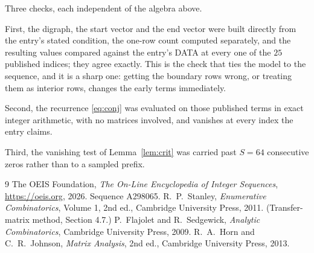 \documentclass[11pt,a4paper]{article}
\theoremstyle{plain}
\theoremstyle{definition}
\begin{document}
Three checks, each independent of the algebra above.

First, the digraph, the start vector and the end vector were built directly from the
entry's stated condition, the one-row count computed separately, and the resulting values
compared against the entry's DATA at every one of the $25$ published indices; they
agree exactly. This is the check that ties the model to the sequence, and it is a sharp one:
getting the boundary rows wrong, or treating them as interior rows, changes the early terms
immediately.

Second, the recurrence \eqref{eq:conj} was evaluated on those published terms in exact
integer arithmetic, with no matrices involved, and vanishes at every index the entry claims.

Third, the vanishing test of Lemma~\ref{lem:crit} was carried past $S=64$ consecutive
zeros rather than to a sampled prefix.

\begin{thebibliography}{9}
 The OEIS Foundation, \emph{The On-Line Encyclopedia of Integer
Sequences}, \url{https://oeis.org}, 2026. Sequence A298065.
 R.~P.~Stanley, \emph{Enumerative Combinatorics}, Volume 1, 2nd ed.,
Cambridge University Press, 2011. (Transfer-matrix method, Section 4.7.)
 P.~Flajolet and R.~Sedgewick, \emph{Analytic Combinatorics}, Cambridge
University Press, 2009.
 R.~A.~Horn and C.~R.~Johnson, \emph{Matrix Analysis}, 2nd ed., Cambridge
University Press, 2013.
\end{thebibliography}
\end{document}
